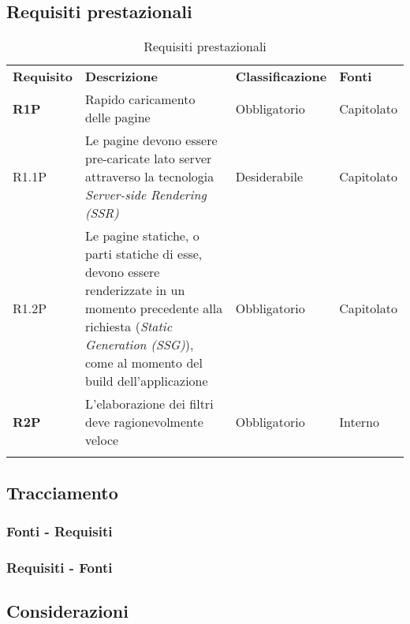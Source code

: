 \newpage
\subsection{Requisiti prestazionali}
\begin{center}
    \centering
    \renewcommand{\arraystretch}{1.8}
    \label{tab:RequisitiPrestazionali}
    \begin{longtable}[!h]{p{50px} p{200px} p{100px} p{50px}}
        \rowcolor{logo!70} \textbf{Requisito} & \textbf{Descrizione}                                                                                                                                                                             & \textbf{Classificazione} & \textbf{Fonti} \\
        \textbf{R1P}                          & Rapido caricamento delle pagine                                                                                                                                                                  & Obbligatorio             & Capitolato     \\
        R1.1P                                 & Le pagine devono essere pre-caricate lato server attraverso la tecnologia \textit{Server-side Rendering (SSR)}                                                                                   & Desiderabile             & Capitolato     \\
        R1.2P                                 & Le pagine statiche, o parti statiche di esse, devono essere renderizzate in un momento precedente alla richiesta (\textit{Static Generation (SSG)}), come al momento del build dell'applicazione & Obbligatorio             & Capitolato     \\
        \textbf{R2P}                          & L'elaborazione dei filtri deve ragionevolmente veloce                                                                                                                                            & Obbligatorio             & Interno        \\
        \rowcolor{white}\caption{Requisiti prestazionali}
    \end{longtable}
\end{center}

\newpage
\subsection{Tracciamento}
\subsubsection{Fonti - Requisiti}


\newpage
\subsubsection{Requisiti - Fonti}


\subsection{Considerazioni}
